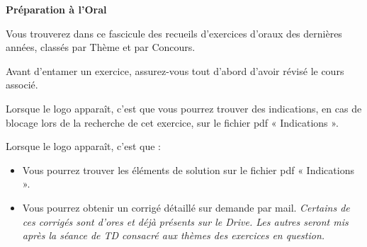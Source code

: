 




\pagestyle{fancy} 
\fancyhead{}
%








\begin{tcolorbox}[colback=white,colframe=black!75!black]
\par
\begin{center}
    \LARGE{\textbf{Préparation à l'Oral}}
\vspace{0.5em}
\end{center}
\end{tcolorbox}

\vspace{2cm}

\begin{minipage}[t]{0.8\textwidth} %

Vous trouverez dans ce fascicule des recueils d’exercices d’oraux des dernières années, classés par Thème et par Concours.

Avant d’entamer un exercice, assurez-vous tout d’abord d’avoir révisé le cours associé.

Lorsque le logo \indications \hspace{0.5em}  apparaît, c’est que vous pourrez trouver des indications, en cas de blocage lors de la recherche de cet exercice, sur le fichier pdf « Indications ».

Lorsque le logo \corrige \hspace{0.5em} apparaît, c’est que :
\begin{itemize}
\item	Vous pourrez trouver les éléments de solution sur le fichier pdf « Indications ». 
\item Vous pourrez obtenir un corrigé détaillé sur demande par mail.  \textit{
Certains de ces corrigés sont d’ores et déjà présents sur le Drive. Les autres seront mis après la séance de TD consacré aux thèmes des exercices en question.}
\end{itemize}
\end{minipage}
\hfill %
\begin{minipage}[t]{0.15\textwidth} %
\vspace{0.5em}
\end{minipage}

